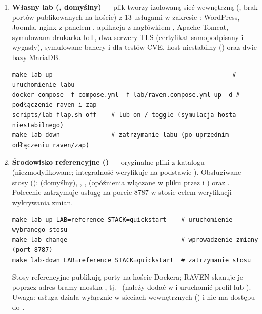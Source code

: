 \documentclass[10pt,a4paper]{article}
\begin{document}
\begin{enumerate}
  \item \textbf{Własny lab (, domyślny)} --- plik  tworzy izolowaną sieć wewnętrzną  (, brak portów publikowanych na hoście) z 13 usługami w zakresie : WordPress, Joomla, nginx z panelem , aplikacja z nagłówkiem , Apache Tomcat, symulowana drukarka IoT, dwa serwery TLS (certyfikat samopodpisany i wygasły), symulowane banery  i  dla testów CVE, host niestabilny () oraz dwie bazy MariaDB.
\begin{cmdbox}
\begin{Verbatim}[fontsize=\footnotesize]
make lab-up                                                 # uruchomienie labu
docker compose -f compose.yml -f lab/raven.compose.yml up -d # podłączenie raven i zap
scripts/lab-flap.sh off    # lub on / toggle (symulacja hosta niestabilnego)
make lab-down              # zatrzymanie labu (po uprzednim odłączeniu raven/zap)
\end{Verbatim}
\end{cmdbox}
  \item \textbf{Środowisko referencyjne ()} --- oryginalne pliki z katalogu  (niezmodyfikowane; integralność weryfikuje  na podstawie ). Obsługiwane stosy ():  (domyślny), , ,  (opóźnienia włączane w pliku  przez  i ) oraz . Polecenie  zatrzymuje usługę na porcie 8787 w stosie  celem weryfikacji wykrywania zmian.
\begin{cmdbox}
\begin{Verbatim}[fontsize=\footnotesize]
make lab-up LAB=reference STACK=quickstart    # uruchomienie wybranego stosu
make lab-change                               # wprowadzenie zmiany (port 8787)
make lab-down LAB=reference STACK=quickstart  # zatrzymanie stosu
\end{Verbatim}
\end{cmdbox}
  Stosy referencyjne publikują porty na hoście Dockera; RAVEN skanuje je poprzez adres bramy mostka , tj.~ (należy dodać  w  i uruchomić profil  lub ). Uwaga: usługa  działa wyłącznie w sieciach wewnętrznych () i nie ma dostępu do .
\end{enumerate}
\end{document}
